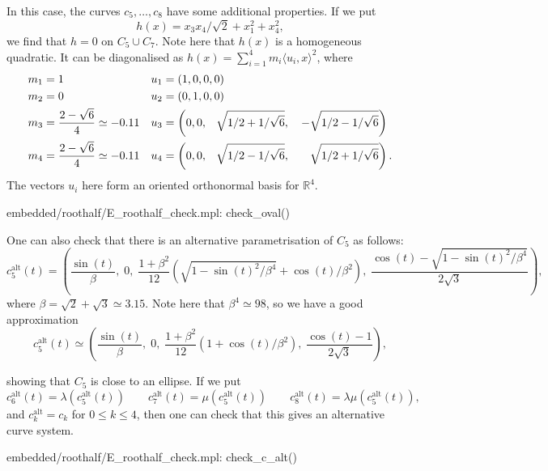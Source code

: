 \documentclass[reqno]{amsart}
\newcommand{\bt}        {\beta}
\newcommand{\lm}        {\lambda}
\newcommand{\R}         {{\mathbb{R}}}
\newcommand{\ip}[1]     {\langle #1\rangle}
\newcommand{\rt}        {\sqrt{2}}
\newcommand{\pp}        {\hphantom{+}}
\renewcommand{\:}{\colon}
\theoremstyle{definition}
\begin{document}
In this case, the curves $c_5,\dotsc,c_8$ have some additional
properties.  If we put
\[ h(x) = x_3x_4/\rt+x_1^2+x_4^2, \]
we find that $h=0$ on $C_5\cup C_7$.  Note here that $h(x)$ is a
homogeneous quadratic.  It can be diagonalised as
$h(x)=\sum_{i=1}^4m_i\ip{u_i,x}^2$, where
\begin{align*}
 m_1 &= 1 &
 u_1 &= (1,0,0,0) \\
 m_2 &= 0 &
 u_2 &= (0,1,0,0) \\
 m_3 &= \frac{2-\sqrt{6}}{4} \simeq -0.11 &
 u_3 &= \left(0,0,\pp\sqrt{1/2+1/\sqrt{6}},\quad -\sqrt{1/2-1/\sqrt{6}}\right) \\
 m_4 &= \frac{2-\sqrt{6}}{4} \simeq -0.11 &
 u_4 &= \left(0,0,\pp\sqrt{1/2-1/\sqrt{6}},\quad\pp\sqrt{1/2+1/\sqrt{6}}\right).
\end{align*}
The vectors $u_i$ here form an oriented orthonormal basis for $\R^4$.
\begin{checks}
 embedded/roothalf/E_roothalf_check.mpl: check_oval()
\end{checks}
One can also check that there is an alternative parametrisation of
$C_5$ as follows:
\[
 c_5^{\text{alt}}(t) =
 \left(\frac{\sin(t)}{\bt},\;0,\;
 \frac{1+\bt^2}{12}\left(\sqrt{1-\sin(t)^2/\bt^4} +  \cos(t)/\bt^2\right),\;
 \frac{\cos(t)-\sqrt{1-\sin(t)^2/\bt^4}}{2\sqrt{3}}\right),
\]
where $\bt=\sqrt{2}+\sqrt{3}\simeq 3.15$.  Note here that
$\bt^4\simeq 98$, so we have a good approximation
\[
 c_5^{\text{alt}}(t) \simeq
 \left(\frac{\sin(t)}{\bt},\;0,\;
 \frac{1+\bt^2}{12}\left(1 +  \cos(t)/\bt^2\right),\;
 \frac{\cos(t)-1}{2\sqrt{3}}\right),
\]

showing that $C_5$ is close to an ellipse.  If we put
\[ c_6^{\text{alt}}(t) = \lm(c_5^{\text{alt}}(t)) \qquad
   c_7^{\text{alt}}(t) = \mu(c_5^{\text{alt}}(t)) \qquad
   c_8^{\text{alt}}(t) = \lm\mu(c_5^{\text{alt}}(t)),
\]
and $c_k^{\text{alt}}=c_k$ for $0\leq k\leq 4$, then one can check
that this gives an alternative curve system.
\begin{checks}
 embedded/roothalf/E_roothalf_check.mpl: check_c_alt()
\end{checks}
\end{document}
